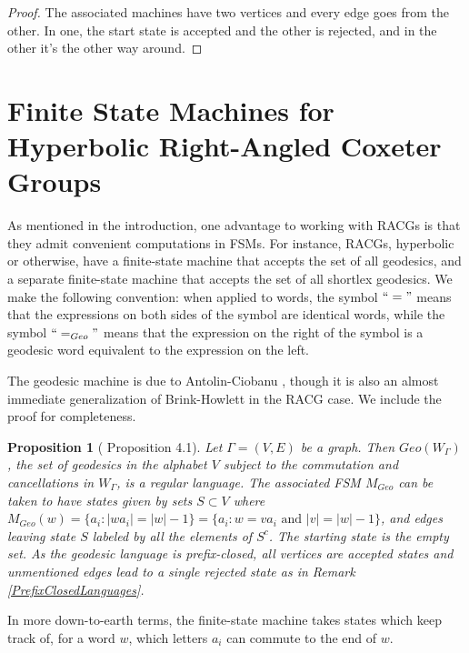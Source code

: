 \documentclass{amsart}
\newtheorem{proposition}[theorem]{Proposition}
\theoremstyle{definition}
\theoremstyle{remark}
\begin{document}
	\begin{proof}
		The associated machines have two vertices and every edge goes from the other. In one, the start state is accepted and the other is rejected, and in the other it's the other way around.
	\end{proof}
	
	\section{Finite State Machines for Hyperbolic Right-Angled Coxeter Groups}
	\label{sec:FSMs}
	
	As mentioned in the introduction, one advantage to working with RACGs is that they admit convenient computations in FSMs. For instance, RACGs, hyperbolic or otherwise, have a finite-state machine that accepts the set of all geodesics, and a separate finite-state machine that accepts the set of all shortlex geodesics. We make the following convention: when applied to words, the symbol $``="$ means that the expressions on both sides of the symbol are identical words, while the symbol $``=_{Geo}"$ means that the expression on the right of the symbol is a geodesic word equivalent to the expression on the left.

    The geodesic machine is due to Antolin-Ciobanu \cite{AntolinCiobanu}, though it is also an almost immediate generalization of Brink-Howlett in the RACG case. We include the proof for completeness.
    
	\begin{proposition} [\cite{AntolinCiobanu} Proposition 4.1]
		
		Let $\Gamma=(V,E)$ be a graph. Then $Geo(W_\Gamma)$, the set of geodesics in the alphabet $V$ subject to the commutation and cancellations in $W_\Gamma$, is a regular language. The associated FSM $M_{Geo}$ can be taken to have states given by sets $S\subset V$ where \newline $M_{Geo}(w)=\{a_i: |wa_i|=|w|-1\}=\{a_i: w=va_i \text{ and } |v|=|w|-1\}$, and edges leaving state $S$ labeled by all the elements of $S^c$. The starting state is the empty set. As the geodesic language is prefix-closed, all vertices are accepted states and unmentioned edges lead to a single rejected state as in Remark \ref{PrefixClosedLanguages}.
		
	\end{proposition}
	
	In more down-to-earth terms, the finite-state machine takes states which keep track of, for a word $w$, which letters $a_i$ can commute to the end of $w$.
	
\end{document}
